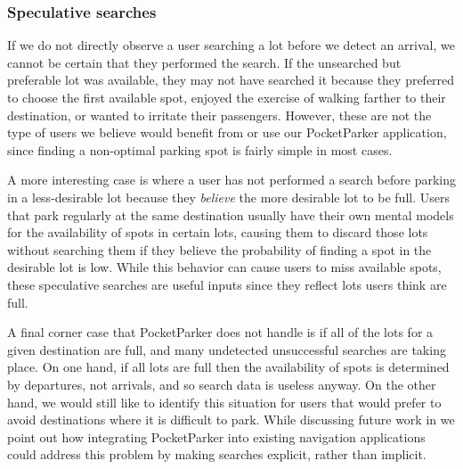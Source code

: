 \subsubsection{Speculative searches}

If we do not directly observe a user searching a lot before we detect an
arrival, we cannot be certain that they performed the search. If the
unsearched but preferable lot was available, they may not have searched it
because they preferred to choose the first available spot, enjoyed the
exercise of walking farther to their destination, or wanted to irritate
their passengers. However, these are not the type of users we believe
would benefit from or use our PocketParker application, since finding a
non-optimal parking spot is fairly simple in most cases.

A more interesting case is where a user has not performed a search before
parking in a less-desirable lot because they \textit{believe} the more
desirable lot to be full. Users that park regularly at the same destination
usually have their own mental models for the availability of spots in certain
lots, causing them to discard those lots without searching them if they
believe the probability of finding a spot in the desirable lot is low. While
this behavior can cause users to miss available spots, these speculative
searches are useful inputs since they reflect lots users think are full.

A final corner case that PocketParker does not handle is if all of the lots
for a given destination are full, and many undetected unsuccessful searches
are taking place. On one hand, if all lots are full then the availability of
spots is determined by departures, not arrivals, and so search data is
useless anyway. On the other hand, we would still like to identify this
situation for users that would prefer to avoid destinations where it is
difficult to park. While discussing future work in we point out how
integrating PocketParker into existing navigation applications could address
this problem by making searches explicit, rather than implicit.

